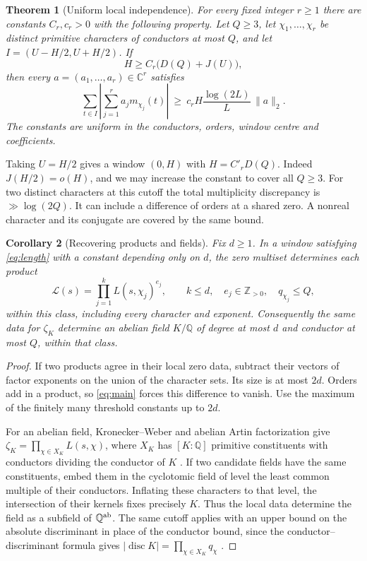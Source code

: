 \documentclass[11pt]{article}
\newtheorem{theorem}{Theorem}[section]
\newtheorem{corollary}[theorem]{Corollary}
\newcommand{\C}{\mathbb C}\newcommand{\R}{\mathbb R}\newcommand{\Q}{\mathbb Q}
\begin{document}
\begin{theorem}[Uniform local independence]\label{thm:main}
For every fixed integer \(r\ge1\) there are constants \(C_r,c_r>0\) with the following property. Let \(Q\ge3\), let \(\chi_1,\ldots,\chi_r\) be distinct primitive characters of conductors at most \(Q\), and let \(I=(U-H/2,U+H/2)\). If
\begin{equation}\label{eq:length}
 H\ge C_r\bigl(D(Q)+J(U)\bigr),
\end{equation}
then every \(a=(a_1,\ldots,a_r)\in\C^r\) satisfies
\begin{equation}\label{eq:main}
 \sum_{t\in I}\left|\sum_{j=1}^r a_j m_{\chi_j}(t)\right|
 \ \ge\ c_r H\frac{\log(2L)}{L}\,\|a\|_2 .
\end{equation}
The constants are uniform in the conductors, orders, window centre and coefficients.
\end{theorem}

Taking \(U=H/2\) gives a window \((0,H)\) with \(H=C'_r D(Q)\). Indeed \(J(H/2)=o(H)\), and we may increase the constant to cover all \(Q\ge3\). For two distinct characters at this cutoff the total multiplicity discrepancy is \(\gg\log(2Q)\). It can include a difference of orders at a shared zero. A nonreal character and its conjugate are covered by the same bound.

\begin{corollary}[Recovering products and fields]\label{cor:field}
Fix \(d\ge1\). In a window satisfying \eqref{eq:length} with a constant depending only on \(d\), the zero multiset determines each product
\[
 \mathcal L(s)=\prod_{j=1}^{k} L(s,\chi_j)^{e_j},
 \qquad k\le d,\quad e_j\in\mathbb Z_{>0},\quad q_{\chi_j}\le Q,
\]
within this class, including every character and exponent. Consequently the same data for \(\zeta_K\) determine an abelian field \(K/\Q\) of degree at most \(d\) and conductor at most \(Q\), within that class.
\end{corollary}
\begin{proof}
If two products agree in their local zero data, subtract their vectors of factor exponents on the union of the character sets. Its size is at most \(2d\). Orders add in a product, so \eqref{eq:main} forces this difference to vanish. Use the maximum of the finitely many threshold constants up to \(2d\).

For an abelian field, Kronecker--Weber and abelian Artin factorization give \(\zeta_K=\prod_{\chi\in X_K}L(s,\chi)\), where \(X_K\) has \([K:\Q]\) primitive constituents with conductors dividing the conductor of \(K\) \cite{kw}. If two candidate fields have the same constituents, embed them in the cyclotomic field of level the least common multiple of their conductors. Inflating these characters to that level, the intersection of their kernels fixes precisely \(K\). Thus the local data determine the field as a subfield of \(\Q^{\rm ab}\). The same cutoff applies with an upper bound on the absolute discriminant in place of the conductor bound, since the conductor--discriminant formula gives \(|\operatorname{disc} K|=\prod_{\chi\in X_K}q_\chi\) \cite[Thm.~3.11]{wash}.
\end{proof}
\end{document}

